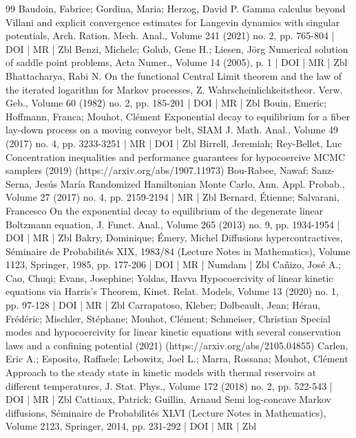 \begin{thebibliography}{99}
Baudoin, Fabrice; Gordina, Maria; Herzog, David P. Gamma calculus beyond Villani and explicit convergence estimates for Langevin dynamics with singular potentials, Arch. Ration. Mech. Anal., Volume 241 (2021) no. 2, pp. 765-804 | DOI | MR | Zbl
Benzi, Michele; Golub, Gene H.; Liesen, Jörg Numerical solution of saddle point problems, Acta Numer., Volume 14 (2005), p. 1 | DOI | MR | Zbl
Bhattacharya, Rabi N. On the functional Central Limit theorem and the law of the iterated logarithm for Markov processes, Z. Wahrscheinlichkeitstheor. Verw. Geb., Volume 60 (1982) no. 2, pp. 185-201 | DOI | MR | Zbl
Bouin, Emeric; Hoffmann, Franca; Mouhot, Clément Exponential decay to equilibrium for a fiber lay-down process on a moving conveyor belt, SIAM J. Math. Anal., Volume 49 (2017) no. 4, pp. 3233-3251 | MR | DOI | Zbl
Birrell, Jeremiah; Rey-Bellet, Luc Concentration inequalities and performance guarantees for hypocoercive MCMC samplers (2019) (https://arxiv.org/abs/1907.11973)
Bou-Rabee, Nawaf; Sanz-Serna, Jesús María Randomized Hamiltonian Monte Carlo, Ann. Appl. Probab., Volume 27 (2017) no. 4, pp. 2159-2194 | MR | Zbl
Bernard, Étienne; Salvarani, Francesco On the exponential decay to equilibrium of the degenerate linear Boltzmann equation, J. Funct. Anal., Volume 265 (2013) no. 9, pp. 1934-1954 | DOI | MR | Zbl
Bakry, Dominique; Émery, Michel Diffusions hypercontractives, Séminaire de Probabilités XIX, 1983/84 (Lecture Notes in Mathematics), Volume 1123, Springer, 1985, pp. 177-206 | DOI | MR | Numdam | Zbl
Cañizo, José A.; Cao, Chuqi; Evans, Josephine; Yoldas, Havva Hypocoercivity of linear kinetic equations via Harris’s Theorem, Kinet. Relat. Models, Volume 13 (2020) no. 1, pp. 97-128 | DOI | MR | Zbl
Carrapatoso, Kleber; Dolbeault, Jean; Hérau, Frédéric; Mischler, Stéphane; Mouhot, Clément; Schmeiser, Christian Special modes and hypocoercivity for linear kinetic equations with several conservation laws and a confining potential (2021) (https://arxiv.org/abs/2105.04855)
Carlen, Eric A.; Esposito, Raffaele; Lebowitz, Joel L.; Marra, Rossana; Mouhot, Clément Approach to the steady state in kinetic models with thermal reservoirs at different temperatures, J. Stat. Phys., Volume 172 (2018) no. 2, pp. 522-543 | DOI | MR | Zbl
Cattiaux, Patrick; Guillin, Arnaud Semi log-concave Markov diffusions, Séminaire de Probabilités XLVI (Lecture Notes in Mathematics), Volume 2123, Springer, 2014, pp. 231-292 | DOI | MR | Zbl

\end{thebibliography}
